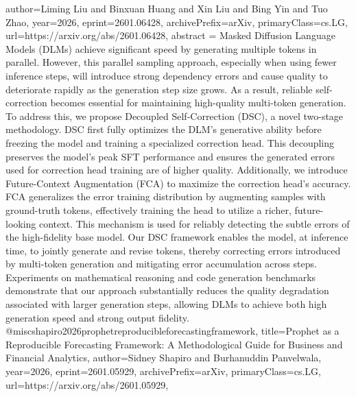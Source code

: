 {      author={Liming Liu and Binxuan Huang and Xin Liu and Bing Yin and Tuo Zhao},
      year={2026},
      eprint={2601.06428},
      archivePrefix={arXiv},
      primaryClass={cs.LG},
      url={https://arxiv.org/abs/2601.06428},
      abstract = {Masked Diffusion Language Models (DLMs) achieve significant speed by generating multiple tokens in parallel. However, this parallel sampling approach, especially when using fewer inference steps, will introduce strong dependency errors and cause quality to deteriorate rapidly as the generation step size grows. As a result, reliable self-correction becomes essential for maintaining high-quality multi-token generation. To address this, we propose Decoupled Self-Correction (DSC), a novel two-stage methodology. DSC first fully optimizes the DLM's generative ability before freezing the model and training a specialized correction head. This decoupling preserves the model's peak SFT performance and ensures the generated errors used for correction head training are of higher quality. Additionally, we introduce Future-Context Augmentation (FCA) to maximize the correction head's accuracy. FCA generalizes the error training distribution by augmenting samples with ground-truth tokens, effectively training the head to utilize a richer, future-looking context. This mechanism is used for reliably detecting the subtle errors of the high-fidelity base model. Our DSC framework enables the model, at inference time, to jointly generate and revise tokens, thereby correcting errors introduced by multi-token generation and mitigating error accumulation across steps. Experiments on mathematical reasoning and code generation benchmarks demonstrate that our approach substantially reduces the quality degradation associated with larger generation steps, allowing DLMs to achieve both high generation speed and strong output fidelity.}
}@misc{shapiro2026prophetreproducibleforecastingframework,
      title={Prophet as a Reproducible Forecasting Framework: A Methodological Guide for Business and Financial Analytics}, 
      author={Sidney Shapiro and Burhanuddin Panvelwala},
      year={2026},
      eprint={2601.05929},
      archivePrefix={arXiv},
      primaryClass={cs.LG},
      url={https://arxiv.org/abs/2601.05929},
}

